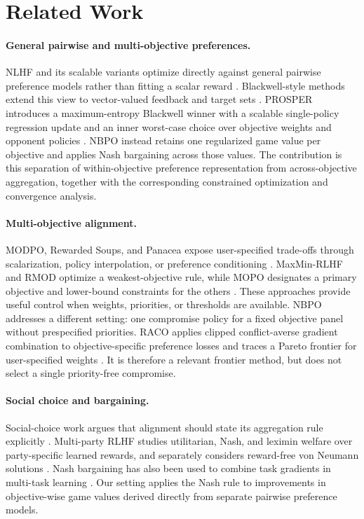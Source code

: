 \documentclass{article}
\theoremstyle{remark}
\theoremstyle{plain}
\newcommand{\NBPO}{\textsc{NBPO}}
\begin{document}
\section{Related Work}
\label{sec:related}
\paragraph{General pairwise and multi-objective preferences.}
NLHF and its scalable variants optimize directly against general pairwise preference models rather than fitting a scalar reward \citep{munos2024nash,wu2025sppo,zhang2025iterative,calandriello2024online,rosset2024direct,zhou2025egpo}. Blackwell-style methods extend this view to vector-valued feedback and target sets \citep{blackwell1956analog,bhatia2020multicriteria}. PROSPER introduces a maximum-entropy Blackwell winner with a scalable single-policy regression update and an inner worst-case choice over objective weights and opponent policies \citep{zhang2026prosper}. \NBPO{} instead retains one regularized game value per objective and applies Nash bargaining across those values. The contribution is this separation of within-objective preference representation from across-objective aggregation, together with the corresponding constrained optimization and convergence analysis.

\paragraph{Multi-objective alignment.}
MODPO, Rewarded Soups, and Panacea expose user-specified trade-offs through scalarization, policy interpolation, or preference conditioning \citep{zhou2024beyond,rame2023rewarded,zhong2024panacea}. MaxMin-RLHF and RMOD optimize a weakest-objective rule, while MOPO designates a primary objective and lower-bound constraints for the others \citep{chakraborty2024maxmin,son2026rmod,agnihotri2026mopo}. These approaches provide useful control when weights, priorities, or thresholds are available. \NBPO{} addresses a different setting: one compromise policy for a fixed objective panel without prespecified priorities.
RACO applies clipped conflict-averse gradient combination to objective-specific preference losses and traces a Pareto frontier for user-specified weights \citep{chen2026raco}. It is therefore a relevant frontier method, but does not select a single priority-free compromise.

\paragraph{Social choice and bargaining.}
Social-choice work argues that alignment should state its aggregation rule explicitly \citep{conitzer2024social}. Multi-party RLHF studies utilitarian, Nash, and leximin welfare over party-specific learned rewards, and separately considers reward-free von Neumann solutions \citep{zhong2024nashwelfare}. Nash bargaining has also been used to combine task gradients in multi-task learning \citep{navon2022nashmtl}. Our setting applies the Nash rule to improvements in objective-wise game values derived directly from separate pairwise preference models.
\end{document}
